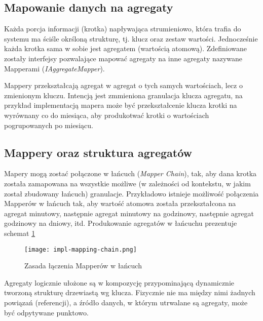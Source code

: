 \subsection{Mapowanie danych na agregaty}

Każda porcja informacji (krotka) napływająca strumieniowo, która trafia do systemu ma ściśle okrśloną strukturę, tj. klucz oraz zestaw wartości. Jednocześnie każda krotka sama w sobie jest agregatem (wartością atomową). Zdefiniowane zostały interfejsy pozwalające mapować agregaty na inne agregaty nazywane Mapperami (\emph{IAggregateMapper}).

Mappery przekształcają agregat w agregat o tych samych wartościach, lecz o zmienionym kluczu. Intencją jest zmmieniona granulacja klucza agregatu, na przykład implementacją mapera może być przekształcenie klucza krotki na wyrównany co do miesiąca, aby produkotwać krotki o wartościach pogrupowanych po miesiącu.



\subsection{Mappery oraz struktura agregatów}

Mapery mogą zostać połączone w łańcuch (\emph{Mapper Chain}), tak, aby dana krotka została zamapowana na wszystkie możliwe (w zależności od kontekstu, w jakim został zbudowany łańcuch) granulacje. Przykładowo istnieje możliwość połączenia Mapperów w łańcuch tak, aby wartość atomowa została przekształcona na agregat minutowy, następnie agregat minutowy na godzinowy, następnie agregat godzinowy na dniowy, itd. Produkowanie agregatów w łańcuchu prezentuje schemat \ref{fig:impl-mapping-chain}

\begin{figure}[h!]
  \centering
    \texttt{[image: impl-mapping-chain.png]}
  \caption{Zasada łączenia Mapperów w łańcuch}
  \label{fig:impl-mapping-chain}
\end{figure}



Agregaty logicznie ułożone są w kompozycję przypominającą dynamicznie tworzoną strukturę drzewiastą wg klucza. Fizycznie nie ma między nimi żadnych powiązań (referencji), a źródło danych, w którym utrwalane są agregaty, może być odpytywane punktowo.

